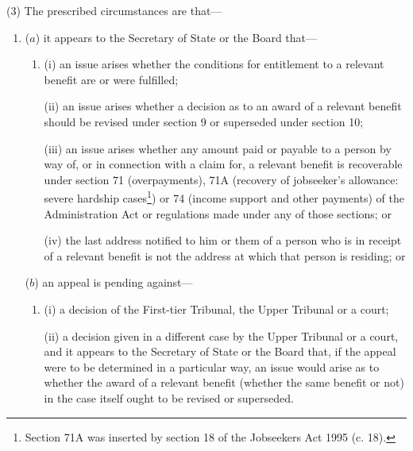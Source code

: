 \documentclass[12pt,a4paper]{article}
\begin{document}
(3) The prescribed circumstances are that—
\begin{enumerate}\item[]
($a$) it appears to the Secretary of State 
or the Board  %
that—
\begin{enumerate}\item[]
(i) an issue arises whether the conditions for entitlement to a relevant benefit are or were fulfilled;

(ii) an issue arises whether a decision as to an award of a relevant benefit should be revised under section 9 or superseded under section 10;

(iii) an issue arises whether any amount paid or payable to a person by way of, or in connection with a claim for, a relevant benefit is recoverable under section 71 (overpayments), 71A (recovery of jobseeker’s allowance: severe hardship cases\footnote{\frenchspacing Section 71A was inserted by section 18 of the Jobseekers Act 1995 (c. 18).}) or 74 (income support and other payments) of the Administration Act or regulations made under any of those sections; or

(iv) the last address notified to him 
or them %
of a person who is in receipt of a relevant benefit is not the address at which that person is residing; or
\end{enumerate}

($b$) an appeal is pending against—
\begin{enumerate}\item[]
(i) a decision of 
the First-tier Tribunal, the Upper Tribunal  %
or a court;

(ii) a decision given in a different case by 
the Upper Tribunal  %
or a court, and it appears to the Secretary of State 
or the Board  %
that, if the appeal were to be determined in a particular way, an issue would arise as to whether the award of a relevant benefit (whether the same benefit or not) in the case itself ought to be revised or superseded.
\end{enumerate}
\end{enumerate}
\end{document}
